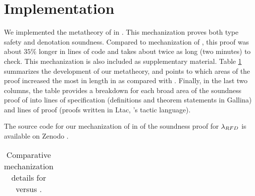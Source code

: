 \section{Implementation}

We implemented the metatheory of \sysrfd in \coq.
This mechanization 
proves both type safety and
denotation soundness. 
%
Compared to mechanization of \sysrf, this proof
was about $35\%$ longer in lines of code and takes
about twice as long (two minutes) to check.
%
This mechanization is also included as supplementary
material.
%
Table \ref{fig:comparisonD} summarizes the development 
of our metatheory, and points to which areas of the 
proof increased the most in length in \sysrfd as compared
with \sysrf. 
%
Finally, in the last two columns, the table provides a breakdown for each
broad area of the soundness proof of \sysrfd into
lines of specification (definitions and theorem statements
in Gallina) and lines of proof (proofs written in Ltac,
\coq's tactic language).


The source code for our mechanization of in \coq 
of the soundness proof for $\lambda_{RFD}$ is available on Zenodo 
\cite{michael_h_borkowski_2024_13352164}.

\begin{table}
  \caption{Comparative mechanization details for \sysrf versus \sysrfd. 
  }
  \label{fig:comparisonD}
  \vspace{0.00cm}
  \begin{tabular}{l}
  \end{tabular}
  \end{table}

